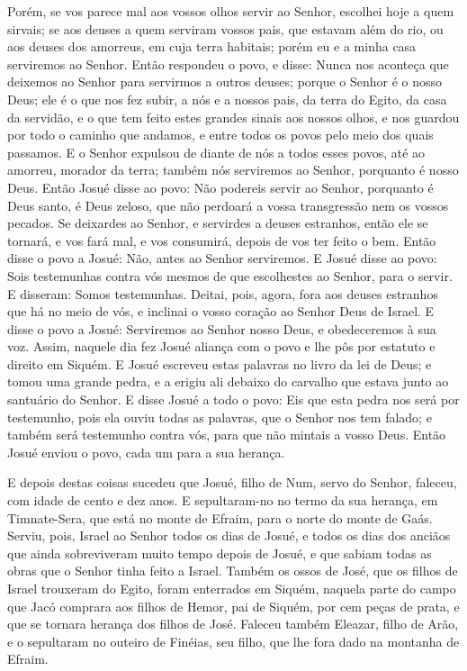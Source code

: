 Porém, se vos parece mal aos vossos olhos servir ao Senhor,
escolhei hoje a quem sirvais; se aos deuses a quem serviram vossos
pais, que estavam além do rio, ou aos deuses dos amorreus, em cuja
terra habitais; porém eu e a minha casa serviremos ao Senhor.
Então respondeu o povo, e disse: Nunca nos aconteça que
deixemos ao Senhor para servirmos a outros deuses; porque o
Senhor é o nosso Deus; ele é o que nos fez subir, a nós e a nossos
pais, da terra do Egito, da casa da servidão, e o que tem feito
estes grandes sinais aos nossos olhos, e nos guardou por todo o
caminho que andamos, e entre todos os povos pelo meio dos quais
passamos. E o Senhor expulsou de diante de nós a todos esses
povos, até ao amorreu, morador da terra; também nós serviremos ao
Senhor, porquanto é nosso Deus. Então Josué disse ao povo:
Não podereis servir ao Senhor, porquanto é Deus santo, é Deus
zeloso, que não perdoará a vossa transgressão nem os vossos pecados.
Se deixardes ao Senhor, e servirdes a deuses estranhos, então
ele se tornará, e vos fará mal, e vos consumirá, depois de vos ter
feito o bem. Então disse o povo a Josué: Não, antes ao Senhor
serviremos. E Josué disse ao povo: Sois testemunhas contra
vós mesmos de que escolhestes ao Senhor, para o servir. E disseram:
Somos testemunhas. Deitai, pois, agora, fora aos deuses
estranhos que há no meio de vós, e inclinai o vosso coração ao
Senhor Deus de Israel. E disse o povo a Josué: Serviremos ao
Senhor nosso Deus, e obedeceremos à sua voz. Assim, naquele
dia fez Josué aliança com o povo e lhe pôs por estatuto e direito em
Siquém. E Josué escreveu estas palavras no livro da lei de
Deus; e tomou uma grande pedra, e a erigiu ali debaixo do carvalho
que estava junto ao santuário do Senhor. E disse Josué a todo
o povo: Eis que esta pedra nos será por testemunho, pois ela ouviu
todas as palavras, que o Senhor nos tem falado; e também será
testemunho contra vós, para que não mintais a vosso Deus.
Então Josué enviou o povo, cada um para a sua herança.

E depois destas coisas sucedeu que Josué, filho de Num, servo do
Senhor, faleceu, com idade de cento e dez anos. E
sepultaram-no no termo da sua herança, em Timnate-Sera, que está no
monte de Efraim, para o norte do monte de Gaás. Serviu, pois,
Israel ao Senhor todos os dias de Josué, e todos os dias dos anciãos
que ainda sobreviveram muito tempo depois de Josué, e que sabiam
todas as obras que o Senhor tinha feito a Israel. Também os
ossos de José, que os filhos de Israel trouxeram do Egito, foram
enterrados em Siquém, naquela parte do campo que Jacó comprara aos
filhos de Hemor, pai de Siquém, por cem peças de prata, e que se
tornara herança dos filhos de José. Faleceu também Eleazar,
filho de Arão, e o sepultaram no outeiro de Finéias, seu filho, que
lhe fora dado na montanha de Efraim.

